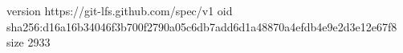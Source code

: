 version https://git-lfs.github.com/spec/v1
oid sha256:d16a16b34046f3b700f2790a05c6db7add6d1a48870a4efdb4e9e2d3e12e67f8
size 2933
